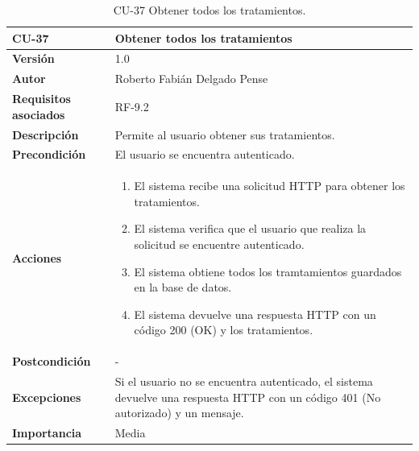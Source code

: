 \begin{table}[p]
	\centering
	\begin{tabularx}{\linewidth}{ p{} p{} }
		\toprule
		\textbf{CU-37}    & \textbf{Obtener todos los tratamientos}\\
		\toprule
		\textbf{Versión}              & 1.0    \\
		\textbf{Autor}                & Roberto Fabián Delgado Pense \\
		\textbf{Requisitos asociados} & RF-9.2 \\ 
		\textbf{Descripción}          & Permite al usuario obtener sus tratamientos. \\
		\textbf{Precondición}         & El usuario se encuentra autenticado. \\  
		\textbf{Acciones}             &
		\begin{enumerate}
			\def\labelenumi{\arabic{enumi}.}
			\tightlist
			\item El sistema recibe una solicitud HTTP para obtener los tratamientos.
                \item El sistema verifica que el usuario que realiza la solicitud se encuentre autenticado.
			\item El sistema obtiene todos los tramtamientos guardados en la base de datos.
                \item El sistema devuelve una respuesta HTTP con un código 200 (OK) y los tratamientos.         
            \end{enumerate}\\
		\textbf{Postcondición}        & -  \\
		\textbf{Excepciones}          &  Si el usuario no se encuentra autenticado, el 
                    sistema devuelve una respuesta HTTP con un código 401 (No autorizado) y un mensaje.\\
		\textbf{Importancia}          & Media \\
		\bottomrule
	\end{tabularx}
	\caption{CU-37 Obtener todos los tratamientos.}
\end{table}

